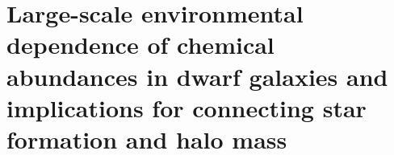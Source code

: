 \chapter{Large-scale environmental dependence of chemical abundances in dwarf galaxies and implications for connecting star formation and halo mass}